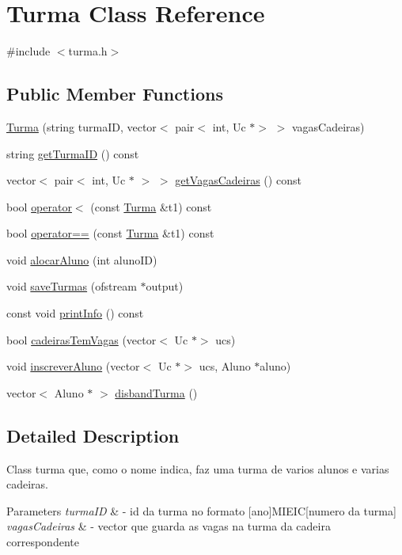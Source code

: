 \hypertarget{class_turma}{}\section{Turma Class Reference}
\label{class_turma}


{\ttfamily \#include $<$turma.\+h$>$}

\subsection*{Public Member Functions}
\begin{DoxyCompactItemize}
\item 
\hyperlink{class_turma_a5ec97571b81ca3fb4664105c277792b3}{Turma} (string turma\+ID, vector$<$ pair$<$ int, Uc $\ast$$>$ $>$ vagas\+Cadeiras)
\item 
string \hyperlink{class_turma_ac2c81d5b5bf756a4a8c779566cc208e6}{get\+Turma\+ID} () const
\item 
vector$<$ pair$<$ int, Uc $\ast$ $>$ $>$ \hyperlink{class_turma_ac70cc3ddd76633aad166753d9a14a42e}{get\+Vagas\+Cadeiras} () const
\item 
bool \hyperlink{class_turma_a4d80e915fa31fbe3ad70de1919641e5e}{operator$<$} (const \hyperlink{class_turma}{Turma} \&t1) const
\item 
bool \hyperlink{class_turma_aa501aa0b3e7aa254a670d1bf35e4ee81}{operator==} (const \hyperlink{class_turma}{Turma} \&t1) const
\item 
void \hyperlink{class_turma_a798f323ec0cdc01337dbdc0499a129cc}{alocar\+Aluno} (int aluno\+ID)
\item 
void \hyperlink{class_turma_a651127027bbf5ef0c86585fc4569f7da}{save\+Turmas} (ofstream $\ast$output)
\item 
const void \hyperlink{class_turma_ad295f90f4a29569b2a01de0acdb16d94}{print\+Info} () const
\item 
bool \hyperlink{class_turma_a08da4cef2b3125047044ea6ce7f65e1f}{cadeiras\+Tem\+Vagas} (vector$<$ Uc $\ast$$>$ ucs)
\item 
void \hyperlink{class_turma_ae717553d232237f5779b3f5c83b0abcb}{inscrever\+Aluno} (vector$<$ Uc $\ast$$>$ ucs, Aluno $\ast$aluno)
\item 
vector$<$ Aluno $\ast$ $>$ \hyperlink{class_turma_ae184df49282ba96f9621d20d6cf0ed40}{disband\+Turma} ()
\end{DoxyCompactItemize}


\subsection{Detailed Description}
Class turma que, como o nome indica, faz uma turma de varios alunos e varias cadeiras. 
\begin{DoxyParams}{Parameters}
{\em turma\+ID} & -\/ id da turma no formato \mbox{[}ano\mbox{]}M\+I\+E\+IC\mbox{[}numero da turma\mbox{]} \\
\hline
{\em vagas\+Cadeiras} & -\/ vector que guarda as vagas na turma da cadeira correspondente \\
\hline
\end{DoxyParams}


